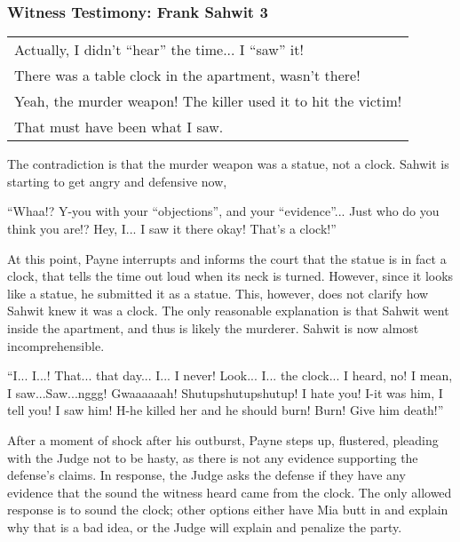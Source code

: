 \subsubsection{Witness Testimony: Frank Sahwit 3}
\begin{center}
\begin{tabular}{p{4in}}
Actually, I didn't ``hear'' the time... I ``saw'' it!\\
There was a table clock in the apartment, wasn't there!\\
Yeah, the murder weapon! The killer used it to hit the victim!\\
That must have been what I saw. \\
\end{tabular}\end{center}

The contradiction is that the murder weapon was a statue, not a clock. Sahwit is starting to get angry and defensive now,\\
\begin{center}
``Whaa!? Y-you with your ``objections'', and your ``evidence''... Just who do you think you are!? Hey, I... I saw it there okay! That's a clock!''
\end{center}
At this point, Payne interrupts and informs the court that the statue is in fact a clock, that tells the time out loud when its neck is turned. However, since it looks like a statue, he submitted it as a statue. This, however, does not clarify how Sahwit knew it was a clock. The only reasonable explanation is that Sahwit went inside the apartment, and thus is likely the murderer. Sahwit is now almost incomprehensible.\\
\begin{center}
``I... I...! That... that day... I... I never! Look... I... the clock... I heard, no! I mean, I saw...Saw...nggg! Gwaaaaaah! Shutupshutupshutup! I hate you! I-it was him, I tell you! I saw him! H-he killed her and he should burn! Burn! Give him death!''\end{center}
After a moment of shock after his outburst, Payne steps up, flustered, pleading with the Judge not to be hasty, as there is not any evidence supporting the defense's claims. In response, the Judge asks the defense if they have any evidence that the sound the witness heard came from the clock. The only allowed response is to sound the clock; other options either have Mia butt in and explain why that is a bad idea, or the Judge will explain and penalize the party. \\
